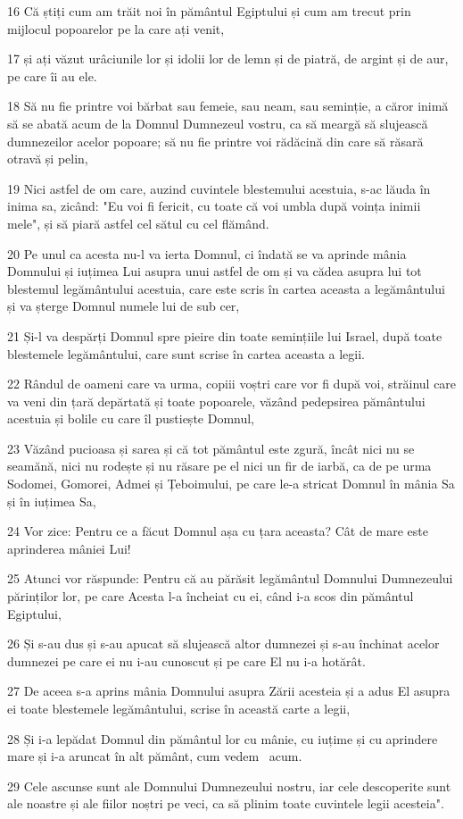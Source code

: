 \par 16 Că știți cum am trăit noi în pământul Egiptului și cum am trecut prin mijlocul popoarelor pe la care ați venit,
\par 17 și ați văzut urâciunile lor și idolii lor de lemn și de piatră, de argint și de aur, pe care îi au ele.
\par 18 Să nu fie printre voi bărbat sau femeie, sau neam, sau seminție, a căror inimă să se abată acum de la Domnul Dumnezeul vostru, ca să meargă să slujească dumnezeilor acelor popoare; să nu fie printre voi rădăcină din care să răsară otravă și pelin,
\par 19 Nici astfel de om care, auzind cuvintele blestemului acestuia, s-ac lăuda în inima sa, zicând: "Eu voi fi fericit, cu toate că voi umbla după voința inimii mele", și să piară astfel cel sătul cu cel flămând.
\par 20 Pe unul ca acesta nu-l va ierta Domnul, ci îndată se va aprinde mânia Domnului și iuțimea Lui asupra unui astfel de om și va cădea asupra lui tot blestemul legământului acestuia, care este scris în cartea aceasta a legământului și va șterge Domnul numele lui de sub cer,
\par 21 Și-l va despărți Domnul spre pieire din toate semințiile lui Israel, după toate blestemele legământului, care sunt scrise în cartea aceasta a legii.
\par 22 Rândul de oameni care va urma, copiii voștri care vor fi după voi, străinul care va veni din țară depărtată și toate popoarele, văzând pedepsirea pământului acestuia și bolile cu care îl pustiește Domnul,
\par 23 Văzând pucioasa și sarea și că tot pământul este zgură, încât nici nu se seamănă, nici nu rodește și nu răsare pe el nici un fir de iarbă, ca de pe urma Sodomei, Gomorei, Admei și Țeboimului, pe care le-a stricat Domnul în mânia Sa și în iuțimea Sa,
\par 24 Vor zice: Pentru ce a făcut Domnul așa cu țara aceasta? Cât de mare este aprinderea mâniei Lui!
\par 25 Atunci vor răspunde: Pentru că au părăsit legământul Domnului Dumnezeului părinților lor, pe care Acesta l-a încheiat cu ei, când i-a scos din pământul Egiptului,
\par 26 Și s-au dus și s-au apucat să slujească altor dumnezei și s-au închinat acelor dumnezei pe care ei nu i-au cunoscut și pe care El nu i-a hotărât.
\par 27 De aceea s-a aprins mânia Domnului asupra Zării acesteia și a adus El asupra ei toate blestemele legământului, scrise în această carte a legii,
\par 28 Și i-a lepădat Domnul din pământul lor cu mânie, cu iuțime și cu aprindere mare și i-a aruncat în alt pământ, cum vedem  acum.
\par 29 Cele ascunse sunt ale Domnului Dumnezeului nostru, iar cele descoperite sunt ale noastre și ale fiilor noștri pe veci, ca să plinim toate cuvintele legii acesteia".

